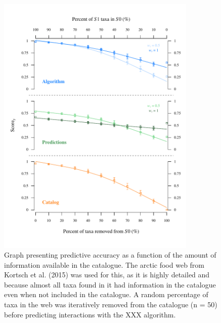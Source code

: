 \documentclass[letterpaper]{article}
\begin{document}
\newpage
    \begin{figure}[h]
      \centering\includegraphics[width=0.85\textwidth]{catalog_predictions2.pdf}
      \caption{Graph presenting predictive accuracy as a function of the amount of information available in the catalogue. The arctic food web from Kortsch et al. (2015) was used for this, as it is highly detailed and because almost all taxa found in it had information in the catalogue even when not included in the catalogue. A random percentage of taxa in the web was iteratively removed from the catalogue (n = 50) before predicting interactions with the XXX algorithm.}
      \label{fig:catalog_pred}
    \end{figure}
\end{document}
